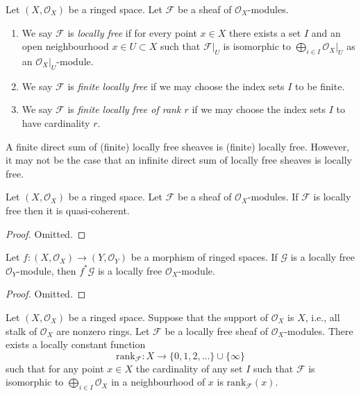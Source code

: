 \begin{definition}
\label{definition-locally-free}
Let $(X, \mathcal{O}_X)$ be a ringed space.
Let $\mathcal{F}$ be a sheaf of $\mathcal{O}_X$-modules.
\begin{enumerate}
\item We say $\mathcal{F}$ is {\it locally free} if for every
point $x \in X$ there exists a set $I$ and an open
neighbourhood $x \in U \subset X$
such that $\mathcal{F}|_U$ is isomorphic to
$\bigoplus_{i \in I} \mathcal{O}_X|_U$ as an $\mathcal{O}_X|_U$-module.
\item We say $\mathcal{F}$ is {\it finite locally free} if we may
choose the index sets $I$ to be finite.
\item We say $\mathcal{F}$ is {\it finite locally free of rank $r$}
if we may choose the index sets $I$ to have cardinality $r$.
\end{enumerate}
\end{definition}

\noindent
A finite direct sum of (finite) locally free sheaves is (finite)
locally free. However, it may not be the case that an infinite direct
sum of locally free sheaves is locally free.

\begin{lemma}
\label{lemma-locally-free-quasi-coherent}
Let $(X, \mathcal{O}_X)$ be a ringed space.
Let $\mathcal{F}$ be a sheaf of $\mathcal{O}_X$-modules.
If $\mathcal{F}$ is locally free then it is quasi-coherent.
\end{lemma}

\begin{proof}
Omitted.
\end{proof}

\begin{lemma}
\label{lemma-pullback-locally-free}
Let $f : (X, \mathcal{O}_X) \to (Y, \mathcal{O}_Y)$
be a morphism of ringed spaces. If $\mathcal{G}$ is
a locally free $\mathcal{O}_Y$-module, then
$f^*\mathcal{G}$ is a locally free $\mathcal{O}_X$-module.
\end{lemma}

\begin{proof}
Omitted.
\end{proof}

\begin{lemma}
\label{lemma-rank}
Let $(X, \mathcal{O}_X)$ be a ringed space.
Suppose that the support of $\mathcal{O}_X$ is $X$,
i.e., all stalk of $\mathcal{O}_X$ are nonzero rings.
Let $\mathcal{F}$ be a locally free sheaf of $\mathcal{O}_X$-modules.
There exists a locally constant function
$$
\text{rank}_\mathcal{F} :
X \longrightarrow \{0, 1, 2, \ldots\}\cup\{\infty\}
$$
such that for any point $x \in X$ the cardinality of any
set $I$ such that $\mathcal{F}$ is isomorphic to
$\bigoplus_{i\in I} \mathcal{O}_X$ in a neighbourhood
of $x$ is $\text{rank}_\mathcal{F}(x)$.
\end{lemma}

